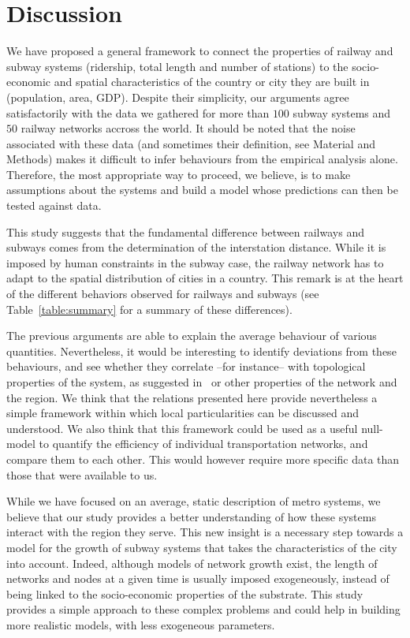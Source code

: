 \section*{Discussion}

We have proposed a general framework to connect the properties of railway and
subway systems (ridership, total length and number of stations) to the
socio-economic and spatial characteristics of the country or city they are built
in (population, area, GDP). Despite their simplicity, our arguments agree
satisfactorily with the data we gathered for more than $100$ subway systems and
$50$ railway networks accross the world. It should be noted that the noise
associated with these data (and sometimes their definition, see Material and
Methods) makes it difficult to infer behaviours from the empirical analysis
alone. Therefore, the most appropriate way to proceed, we believe, is to make
assumptions about the systems and build a model whose predictions can then be
tested against data.

This study suggests that the fundamental difference between railways and subways
comes from the determination of the interstation distance. While it is imposed
by human constraints in the subway case, the railway network has to adapt to the
spatial distribution of cities in a country. This remark is at the heart of the
different behaviors observed for railways and subways (see
Table~\ref{table:summary} for a summary of these differences). 

The previous arguments are able to explain the average behaviour of various
quantities. Nevertheless, it would be interesting to identify deviations from
these behaviours, and see whether they correlate --for instance-- with
topological properties of the system, as suggested in~\cite{Derrible:2009} or
other properties of the network and the region. We think that the relations
presented here provide  nevertheless a simple framework within which local
particularities can be discussed and understood. We also think that this
framework could be used as a useful null-model to quantify the efficiency of
individual transportation networks, and compare them to each other. This would
however require more specific data than those that were available to us. 

While we have focused on an average, static description of metro systems, we
believe that our study provides a better understanding of how these systems
interact with the region they serve. This new insight is a necessary step
towards a model for the growth of subway systems that takes the characteristics
of the city into account. Indeed, although models of network growth exist, the
length of networks and nodes at a given time is usually imposed exogeneously,
instead of being linked to the socio-economic properties of the substrate. This
study provides a simple approach to these complex problems and could help in
building more realistic models, with less exogeneous parameters.


